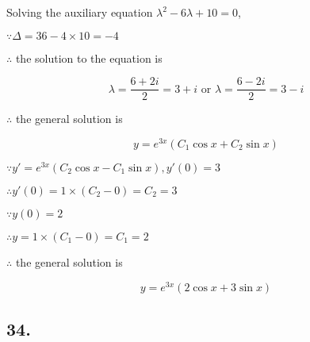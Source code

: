 \documentclass{article}
\begin{document}
  Solving the auxiliary equation $\lambda^2 - 6\lambda + 10 = 0$,

  $\because \Delta = 36 - 4 \times 10 = -4$

  $\therefore$ the solution to the equation is

  $$\lambda = \frac{6 + 2i}{2} = 3 + i \textrm{ or } \lambda = \frac{6 - 2i}{2} = 3 - i$$

  $\therefore$ the general solution is

  $$y = e^{3x} (C_1 \cos x + C_2 \sin x)$$

  $\because y' = e^{3x} (C_2 \cos x - C_1 \sin x), y'(0) = 3$

  $\therefore y'(0) = 1 \times (C_2 - 0) = C_2  = 3$

  $\because y(0) = 2$

  $\therefore y = 1 \times (C_1 - 0) = C_1 = 2$

  $\therefore$ the general solution is

  $$y = e^{3x} (2\cos x + 3\sin x)$$

  \subsection*{34. }
\end{document}

